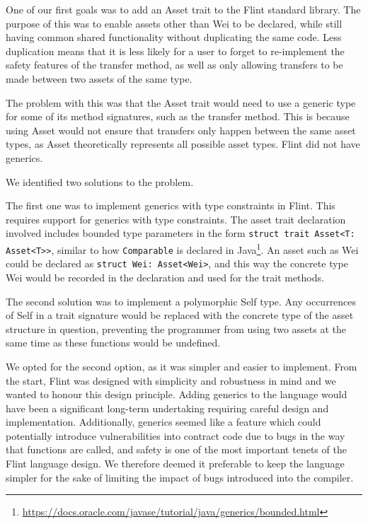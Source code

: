 One of our first goals was to add an Asset trait to the Flint standard library. The purpose of this was to enable assets other than Wei to be declared, while still having common shared functionality without duplicating the same code. Less duplication means that it is less likely for a user to forget to re-implement the safety features of the transfer method, as well as only allowing transfers to be made between two assets of the same type.

The problem with this was that the Asset trait would need to use a generic type for some of its method signatures, such as the transfer method. This is because using Asset would not ensure that transfers only happen between the same asset types, as Asset theoretically represents all possible asset types. Flint did not have generics.

We identified two solutions to the problem. 

The first one was to implement generics with type constraints in Flint. This requires support for generics with type constraints. The asset trait declaration involved includes bounded type parameters in the form \texttt{struct trait Asset<T: Asset<T>>}, similar to how \texttt{Comparable} is declared in Java\footnote{\url{https://docs.oracle.com/javase/tutorial/java/generics/bounded.html}}. An asset such as Wei could be declared as \texttt{struct Wei: Asset<Wei>}, and this way the concrete type Wei would be recorded in the declaration and used for the trait methods.

The second solution was to implement a polymorphic Self type. Any occurrences of Self in a trait signature would be replaced with the concrete type of the asset structure in question, preventing the programmer from using two assets at the same time as these functions would be undefined.

We opted for the second option, as it was simpler and easier to implement. From the start, Flint was designed with simplicity and robustness in mind and we wanted to honour this design principle. Adding generics to the language would have been a significant long-term undertaking requiring careful design and implementation. Additionally, generics seemed like a feature which could potentially introduce vulnerabilities into contract code due to bugs in the way that functions are called, and safety is one of the most important tenets of the Flint language design. We therefore deemed it preferable to keep the language simpler for the sake of limiting the impact of bugs introduced into the compiler.

